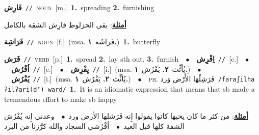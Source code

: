 \documentclass[10pt,a4paper,twoside]{article} %
\begin{document}
\begin{multicols}{2}
{\setlength\topsep{0pt}\textbf{\foreignlanguage{arabic}{فَارِش}}\ {\color{gray}\texttt{//}\color{black}}\ \textsc{noun}\ [m.]\ \textbf{1.}~spreading  \textbf{2.}~furnishing\  \begin{flushright}\color{gray}\foreignlanguage{arabic}{\textbf{\underline{\foreignlanguage{arabic}{أمثلة}}}: بقى الحزلوط فارِش الشقة بالكامل}\end{flushright}\color{black}} \vspace{2mm}

{\setlength\topsep{0pt}\textbf{\foreignlanguage{arabic}{فَرَاشِة}}\ {\color{gray}\texttt{//}\color{black}}\ \textsc{noun}\ [f.]\ \color{gray}(msa. \foreignlanguage{arabic}{فَراشَة}~\foreignlanguage{arabic}{\textbf{١.}})\color{black}\ \textbf{1.}~butterfly\ } \vspace{2mm}

{\setlength\topsep{0pt}\textbf{\foreignlanguage{arabic}{فَرَش}}\ {\color{gray}\texttt{//}\color{black}}\ \textsc{verb}\ [p.]\ \textbf{1.}~spread  \textbf{2.}~lay sth out.  \textbf{3.}~furnish\ \ $\bullet$\ \ \setlength\topsep{0pt}\textbf{\foreignlanguage{arabic}{اِفْرِش}}\ {\color{gray}\texttt{//}\color{black}}\ [c.]\ \ $\bullet$\ \ \setlength\topsep{0pt}\textbf{\foreignlanguage{arabic}{اُفْرُش}}\ {\color{gray}\texttt{//}\color{black}}\ [c.]\ \ $\bullet$\ \ \setlength\topsep{0pt}\textbf{\foreignlanguage{arabic}{يِفْرِش}}\ {\color{gray}\texttt{//}\color{black}}\ [i.]\ \color{gray}(msa. \foreignlanguage{arabic}{يُأثِّث}~\foreignlanguage{arabic}{\textbf{٢.}}  \foreignlanguage{arabic}{يَفْرُش}~\foreignlanguage{arabic}{\textbf{١.}})\color{black}\ \ $\bullet$\ \ \setlength\topsep{0pt}\textbf{\foreignlanguage{arabic}{يُفْرُش}}\ {\color{gray}\texttt{//}\color{black}}\ [i.]\ \color{gray}(msa. \foreignlanguage{arabic}{يُأثِّث}~\foreignlanguage{arabic}{\textbf{٢.}}  \foreignlanguage{arabic}{يَفْرُش}~\foreignlanguage{arabic}{\textbf{١.}})\color{black}\ \ $\bullet$\ \ \textsc{ph.} \color{gray} \foreignlanguage{arabic}{فَرَشِلْهَا الأَرْض وَرد}\color{black}\ {\color{gray}\texttt{/{\sffamily faraʃilha ʔilʔari(dˤ) ward}/}\color{black}}\ \textbf{1.}~It is an idiomatic expression that means that sb made a tremendous effort to make sb happy\  \begin{flushright}\color{gray}\foreignlanguage{arabic}{\textbf{\underline{\foreignlanguage{arabic}{أمثلة}}}: من كثر ما كان يحبها كانوا يقولوا إِنه فَرَشلها الأرض ورد\ $\bullet$\ \  وعدني إِنه يُفْرُش الشقة كلها قبل العيد\ $\bullet$\ \  اُفْرُشي السجاد والله كرَّزنا من البرد}\end{flushright}\color{black}} \vspace{2mm}


\end{multicols}
\end{document}
